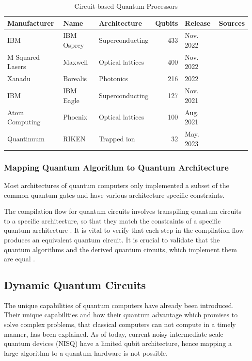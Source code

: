 \documentclass[11pt]{article}
\theoremstyle{definition}
\theoremstyle{definition}
\begin{document}
\begin{table}[htbp]
\caption{\label{tab:org64d2199}Circuit-based Quantum Processors \cite{noauthor_qpu_list_2023}}
\centering
\begin{tabular}{lllrll}
Manufacturer & Name & Architecture & Qubits & Release & Sources\\[0pt]
\hline
IBM & IBM Osprey & Superconducting & 433 & Nov. 2022 & \\[0pt]
M Squared Lasers & Maxwell & Optical lattices & 400 & Nov. 2022 & \\[0pt]
Xanadu & Borealis & Photonics & 216 & 2022 & \cite{madsen_quantum_2022}\\[0pt]
IBM & IBM Eagle & Superconducting & 127 & Nov. 2021 & \\[0pt]
Atom Computing & Phoenix & Optical lattices & 100 & Aug. 2021 & \cite{barnes_assembly_2022}\\[0pt]
Quantinuum & RIKEN \footnotemark & Trapped ion & 32 & May. 2023 & \\[0pt]
\end{tabular}
\end{table}


\subsubsection{Mapping Quantum Algorithm to Quantum Architecture}
\label{sec:org0b40055}
Most architectures of quantum computers only implemented a subset of the common
quantum gates and have various architecture specific constraints.

The compilation flow for quantum circuits involves transpiling
quantum circuits to a specific architecture, so that they match the
constraints of a specific quantum architecture \cite{wille_qmap_2023}.
It is vital to verify that each step in the compilation flow produces an
equivalent quantum circuit.
It is crucial to validate that the quantum algorithms and
the derived quantum circuits, which implement them are equal \cite{peham_equivalence_2022}.


\subsection{Dynamic Quantum Circuits}
\label{sec:org983230b}
The unique capabilities of quantum computers have already been introduced.
Their unique capabilities and how their quantum advantage which promises to
solve complex problems, that classical computers can not compute in a timely
manner, has been explained.
As of today, current noisy intermediate-scale quantum devices (NISQ) have a
limited qubit architecture, hence mapping a large algorithm to a quantum
hardware is not possible.
\end{document}
